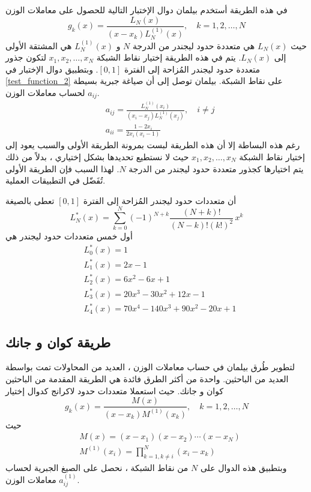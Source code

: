 في هذه الطريقة أستخدم بيلمان دوال الإختبار التالية للحصول على معاملات الوزن
\begin{equation}
	\label{test_function_2}
	g_k(x)=\frac{L_N(x)}{(x-x_k)L_N^{(1)}(x)},\quad k=1,2,\dots,N
\end{equation}
حيث $L_N(x)$ هي متعددة حدود ليجندر من الدرجة $N$ و $L_N^{(1)}(x)$ هي المشتقة الأولى إلى $L_N(x)$. يتم في هذه الطريقة إختيار نقاط الشبكة $x_1,x_2,\dots,x_N$ لتكون جذور متعددة حدود ليجندر المُزاحة إلى الفترة $[0,1]$. وبتطبيق دوال الإختبار في \eqref{test_function_2} على نقاط الشبكة. بيلمان توصل إلى أن صياغة جبرية بسيطة لحساب معاملات الوزن $a_{ij}$.
\begin{equation}
	\label{bilman2_equations}
	\begin{aligned}
		&a_{ij}=\frac{L_N^{(1)}(x_i)}{(x_i-x_j)L_N^{(1)}(x_j)},\quad i\neq j\\[10pt]
		& a_{ii}=\frac{1-2x_i}{2x_i(x_i-1)}   
	\end{aligned}
\end{equation}
رغم هذه البساطة إلا أن هذه الطريقة لبست بمرونة الطريقة الأولى والسبب يعود إلى إختيار نقاط الشبكة $x_1,x_2,\dots,x_N$ حيث لا نستطيع تحديدها بشكل إختياري ، بدلاً من ذلك يتم اختيارها كجذور متعددة حدود ليجندر من الدرجة $N$. لهذا السبب فإن الطريقة الأولى تُفَضّل في التطبيقات العملية.

\begin{note}
	أن متعددات حدود ليجندر المُزاحة إلى الفترة $[0,1]$ تعطى بالصيغة 
	\begin{equation*}
		L_N^{*}(x)=\sum_{k=0}^{N}(-1)^{N+k}\frac{(N+k)!}{(N-k)!(k!)^2}\,x^k
	\end{equation*}
	أول خمس متعددات حدود ليجندر هي
	\begin{align*}
		&L_0^{*}(x)=1\\
		&L_1^{*}(x)=2x-1\\
		&L_2^{*}(x)=6x^2-6x+1\\
		&L_3^{*}(x)=20x^3-30x^2+12x-1\\
		&L_4^{*}(x)=70x^4-140x^3+90x^2-20x+1
	\end{align*}
\end{note}

\subsection[طريقة كوان و جانك]{طريقة كوان و جانك \cite{Quan} }

لتطوير طُرق بيلمان في حساب معاملات الوزن ، العديد من المحاولات تمت بواسطة العديد من الباحثين. واحدة من أكثر الطرق فائدة هي الطريقة المقدمة من الباحثين كوان و جانك. حيث استعملا متعددات حدود لاكرانج كدوال إختيار
\begin{equation}
	\label{test_function_3}
	g_k(x)=\frac{M(x)}{(x-x_k)M^{(1)}(x_k)},\quad k=1,2,\dots,N
\end{equation}
حيث
\begin{align*}
	&M(x)=(x-x_1)(x-x_2)\cdots(x-x_N)\\
	&M^{(1)}(x_i)=\prod_{k=1,k\neq i}^{N}(x_i-x_k)
\end{align*}
وبتطبيق هذه الدوال على $N$ من نقاط الشبكة ، نحصل على الصيغ الجبرية لحساب معاملات الوزن $a_{ij}^{(1)}$.

